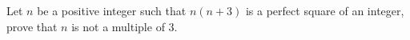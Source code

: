 Let $n$ be a positive integer such that $n(n+3)$ is a perfect square of an integer, prove that $n$ is not a multiple of $3$.